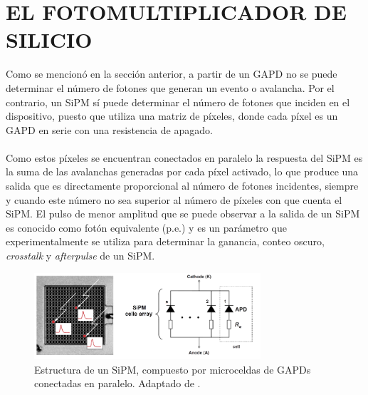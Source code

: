 \section{EL FOTOMULTIPLICADOR DE SILICIO}
Como se mencionó en la sección anterior, a partir de un GAPD no se puede determinar el número de fotones que generan un evento o avalancha. Por el contrario, un SiPM sí puede determinar el número de fotones que inciden en el dispositivo, puesto que utiliza una matriz de píxeles, donde cada píxel es un  GAPD en serie con una resistencia de apagado. \\ \\
Como estos píxeles se encuentran conectados en paralelo la respuesta del SiPM es la suma de las avalanchas generadas por cada píxel activado, lo que produce una salida que es directamente proporcional al número de fotones incidentes, siempre y cuando este número no sea superior al número de píxeles con que cuenta el SiPM. El pulso de menor amplitud que se puede observar a la salida de un SiPM es conocido como fotón equivalente (p.e.) y es un parámetro que experimentalmente se utiliza para determinar la ganancia, conteo oscuro, \textit{crosstalk} y \textit{afterpulse} de un SiPM.
\begin{figure}[h!]
\begin{centering}
  \includegraphics[width=0.75\textwidth]{Images/APD_array.PNG}
    \caption{Estructura de un SiPM, compuesto por microceldas de GAPDs conectadas en paralelo. Adaptado de \citep{Muon_counting_Amiga}.}
    \label{fig:APD_array}  
  \par\end{centering}
\end{figure}
